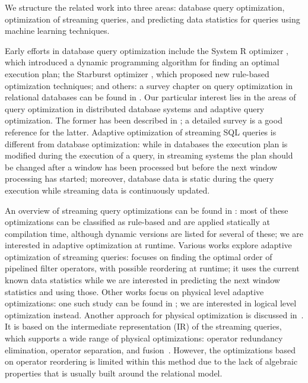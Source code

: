 \label {sec:fs-optimization-related-work}

We structure the related work into three areas: database query optimization, optimization of streaming queries, and predicting data statistics for queries using machine learning techniques.

Early efforts in database query optimization include the System R optimizer \cite{selinger1979access}, which introduced a dynamic programming algorithm for finding an optimal execution plan; the Starburst optimizer \cite{haas1989extensible}, which proposed new rule-based optimization techniques; and others: a survey chapter on query optimization in relational databases can be found in \cite{Neumann2018optimization}. Our particular interest lies in the areas of query optimization in distributed database systems and adaptive query optimization. The former has been described in \cite{kossmann2000thestate}; a detailed survey \cite{deshpande2007adaptive} is a good reference for the latter. Adaptive optimization of streaming SQL queries is different from database optimization: while in databases the execution plan is modified during the execution of a query, in streaming systems the plan should be changed after a window has been processed but before the next window processing has started; moreover, database data is static during the query execution while streaming data is continuously updated.

An overview of streaming query optimizations can be found in \cite{hirzel2014catalog}: most of these optimizations can be classified as rule-based and are applied statically at compilation time, although dynamic versions are listed for several of these; we are interested in adaptive optimization at runtime. Various works explore adaptive optimization of streaming queries: \cite{babu2004adaptive} focuses on finding the optimal order of pipelined filter operators, with possible reordering at runtime; it uses the current known data statistics while we are interested in predicting the next window statistics and using those. Other works focus on physical level adaptive optimizations: one such study can be found in \cite{grulich2020grizzly}; we are interested in logical level optimization instead. Another approach for physical optimization is discussed in~\cite{kroll2019arc}. It is based on the intermediate representation (IR) of the streaming queries, which supports a wide range of physical optimizations: operator redundancy elimination, operator separation, and fusion~\cite{hirzel2014catalog}. However, the optimizations based on operator reordering is limited within this method due to the lack of algebraic properties that is usually built around the relational model.

